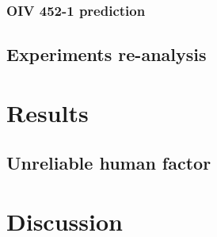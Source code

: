 \documentclass[english]{article}
\begin{document}
\subsubsection*{OIV 452-1 prediction}

\subsection*{Experiments re-analysis}

\section*{Results}

\subsection{Unreliable human factor}

\section*{Discussion}

\printbibliography
\end{document}
